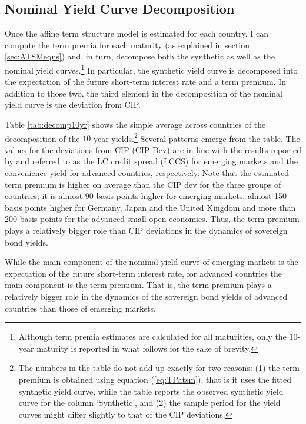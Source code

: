 {\subsection{Nominal Yield Curve Decomposition}
Once the affine term structure model is estimated for each country, I can compute the term premia for each maturity (as explained in section \ref{sec:ATSMeqns}) and, in turn, decompose both the synthetic as well as the nominal yield curves.\footnote{Although term premia estimates are calculated for all maturities, only the $10$-year maturity is reported in what follows for the sake of brevity.} In particular, the synthetic yield curve is decomposed into the expectation of the future short-term interest rate and a term premium. In addition to those two, the third element in the decomposition of the nominal yield curve is the deviation from CIP.

Table \ref{tab:decomp10yr} shows the simple average across countries of the decomposition of the $10$-year yields.\footnote{The numbers in the table do not add up exactly for two reasons: (1) the term premium is obtained using equation (\ref{eq:TPatsm}), that is it uses the fitted synthetic yield curve, while the table reports the observed synthetic yield curve for the column `Synthetic', and (2) the sample period for the yield curves might differ slightly to that of the CIP deviations.} Several patterns emerge from the table. The values for the deviations from CIP (CIP Dev) are in line with the results reported by \cite{DuSchreger:2016JoF} and \cite{DuImSchreger:2018JIE} referred to as the LC credit spread (LCCS) for emerging markets and the convenience yield for advanced countries, respectively. Note that the estimated term premium is higher on average than the CIP dev for the three groups of countries; it is almost 90 basis points higher for emerging markets, almost 150 basis points higher for Germany, Japan and the United Kingdom and more than 200 basis points for the advanced small open economies. Thus, the term premium plays a relatively bigger role than CIP deviations in the dynamics of sovereign bond yields. %
	
%	

While the main component of the nominal yield curve of emerging markets is the expectation of the future short-term interest rate, for advanced countries the main component is the term premium. That is, the term premium plays a relatively bigger role in the dynamics of the sovereign bond yields of advanced countries than those of emerging markets.

}
